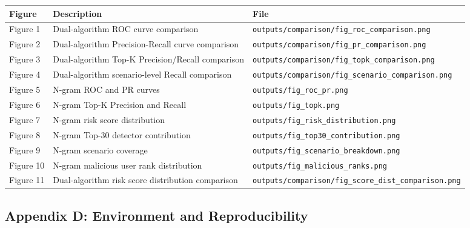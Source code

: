 \documentclass[
  a4paper,
  11pt]{article}
\newcounter{none} %
\begin{document}
{\def\LTcaptype{none} %
\begin{longtable}[]{@{}lll@{}}
\toprule\noalign{}
Figure & Description & File \\
\midrule\noalign{}
\endhead
\bottomrule\noalign{}
\endlastfoot
Figure 1 & Dual-algorithm ROC curve comparison &
\texttt{outputs/comparison/fig\_roc\_comparison.png} \\
Figure 2 & Dual-algorithm Precision-Recall curve comparison &
\texttt{outputs/comparison/fig\_pr\_comparison.png} \\
Figure 3 & Dual-algorithm Top-K Precision/Recall comparison &
\texttt{outputs/comparison/fig\_topk\_comparison.png} \\
Figure 4 & Dual-algorithm scenario-level Recall comparison &
\texttt{outputs/comparison/fig\_scenario\_comparison.png} \\
Figure 5 & N-gram ROC and PR curves &
\texttt{outputs/fig\_roc\_pr.png} \\
Figure 6 & N-gram Top-K Precision and Recall &
\texttt{outputs/fig\_topk.png} \\
Figure 7 & N-gram risk score distribution &
\texttt{outputs/fig\_risk\_distribution.png} \\
Figure 8 & N-gram Top-30 detector contribution &
\texttt{outputs/fig\_top30\_contribution.png} \\
Figure 9 & N-gram scenario coverage &
\texttt{outputs/fig\_scenario\_breakdown.png} \\
Figure 10 & N-gram malicious user rank distribution &
\texttt{outputs/fig\_malicious\_ranks.png} \\
Figure 11 & Dual-algorithm risk score distribution comparison &
\texttt{outputs/comparison/fig\_score\_dist\_comparison.png} \\
\end{longtable}
}

\subsection{Appendix D: Environment and
Reproducibility}\label{appendix-d-environment-and-reproducibility}
\end{document}
